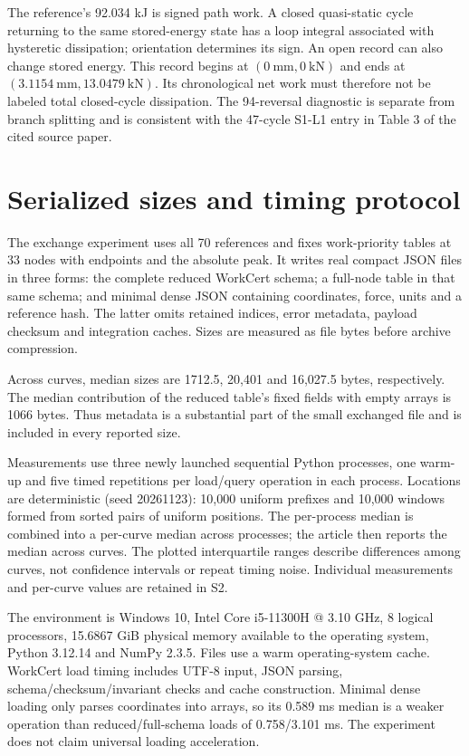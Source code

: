 \documentclass[11pt,a4paper]{article}
\begin{document}
The reference's 92.034 kJ is signed path work. A closed quasi-static cycle returning to the same stored-energy state has a loop integral associated with hysteretic dissipation; orientation determines its sign. An open record can also change stored energy. This record begins at $(0\ \mathrm{mm},0\ \mathrm{kN})$ and ends at $(3.1154\ \mathrm{mm},13.0479\ \mathrm{kN})$. Its chronological net work must therefore not be labeled total closed-cycle dissipation. The 94-reversal diagnostic is separate from branch splitting and is consistent with the 47-cycle S1-L1 entry in Table 3 of the cited source paper.

\section{Serialized sizes and timing protocol}
The exchange experiment uses all 70 references and fixes work-priority tables at 33 nodes with endpoints and the absolute peak. It writes real compact JSON files in three forms: the complete reduced WorkCert schema; a full-node table in that same schema; and minimal dense JSON containing coordinates, force, units and a reference hash. The latter omits retained indices, error metadata, payload checksum and integration caches. Sizes are measured as file bytes before archive compression.

Across curves, median sizes are 1712.5, 20,401 and 16,027.5 bytes, respectively. The median contribution of the reduced table's fixed fields with empty arrays is 1066 bytes. Thus metadata is a substantial part of the small exchanged file and is included in every reported size.

Measurements use three newly launched sequential Python processes, one warm-up and five timed repetitions per load/query operation in each process. Locations are deterministic (seed 20261123): 10,000 uniform prefixes and 10,000 windows formed from sorted pairs of uniform positions. The per-process median is combined into a per-curve median across processes; the article then reports the median across curves. The plotted interquartile ranges describe differences among curves, not confidence intervals or repeat timing noise. Individual measurements and per-curve values are retained in S2.

The environment is Windows 10, Intel Core i5-11300H @ 3.10 GHz, 8 logical processors, 15.6867 GiB physical memory available to the operating system, Python 3.12.14 and NumPy 2.3.5. Files use a warm operating-system cache. WorkCert load timing includes UTF-8 input, JSON parsing, schema/checksum/invariant checks and cache construction. Minimal dense loading only parses coordinates into arrays, so its 0.589 ms median is a weaker operation than reduced/full-schema loads of 0.758/3.101 ms. The experiment does not claim universal loading acceleration.
\end{document}
